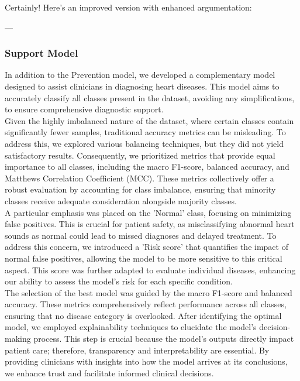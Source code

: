 Certainly! Here’s an improved version with enhanced argumentation:

---

\subsubsection*{Support Model}

In addition to the Prevention model, we developed a complementary model designed to assist clinicians in diagnosing heart diseases.
This model aims to accurately classify all classes present in the dataset, avoiding any simplifications, to ensure comprehensive diagnostic support.\\
Given the highly imbalanced nature of the dataset, where certain classes contain significantly fewer samples, traditional accuracy metrics can be misleading.
To address this, we explored various balancing techniques, but they did not yield satisfactory results.
Consequently, we prioritized metrics that provide equal importance to all classes, including the macro F1-score, balanced accuracy,
and Matthews Correlation Coefficient (MCC). These metrics collectively offer a robust evaluation by accounting for class imbalance,
ensuring that minority classes receive adequate consideration alongside majority classes.\\
A particular emphasis was placed on the 'Normal' class, focusing on minimizing false positives. This is crucial for patient safety,
as misclassifying abnormal heart sounds as normal could lead to missed diagnoses and delayed treatment.
To address this concern, we introduced a 'Risk score' that quantifies the impact of normal false positives, allowing
the model to be more sensitive to this critical aspect. This score was further adapted to evaluate individual diseases,
enhancing our ability to assess the model's risk for each specific condition.\\
The selection of the best model was guided by the macro F1-score and balanced accuracy.
These metrics comprehensively reflect performance across all classes, ensuring that no disease category is overlooked.
After identifying the optimal model, we employed explainability techniques to elucidate the model’s decision-making process.
 This step is crucial because the model's outputs directly impact patient care; therefore, transparency and interpretability are essential. 
 By providing clinicians with insights into how the model arrives at its conclusions, we enhance trust and facilitate informed clinical decisions.\\
